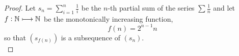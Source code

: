 \documentclass[../MathsNotesBase.tex]{subfiles}
\begin{document}
{	
%			
%			
	
		\bigskip
		\begin{proof}\nl[2]
			Let ${ s_n = \sum_{i=1}^n \frac{1}{i} }$ be the $n$-th partial sum of the series ${ \sum \frac{1}{n} }$ and let ${ f: \mathbb{N}^{} \longmapsto \mathbb{N}^{} }$ be the monotonically increasing function,
			\[ f(n) = 2^{n-1} n \]
			so that $(s_{f(n)})$ is a subsequence of $(s_n)$.\\
			

\end{proof}}
\end{document}
